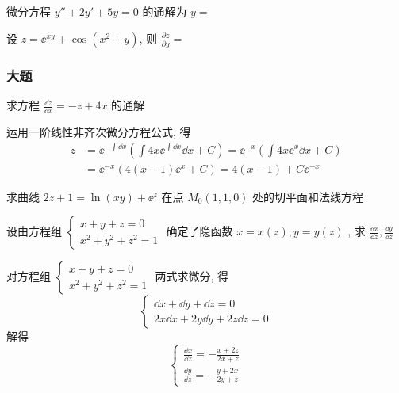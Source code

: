 \begin{ti}
	微分方程 $y''+2y'+5y=0$ 的通解为 $y=$ 
\end{ti}

\begin{ti}
	设 $z=\ee^{xy}+\cos\left(x^2+y\right)$, 则 $\frac{\partial z}{\partial y}=$ 
\end{ti}

\subsubsection{大题}
\begin{ti}
	求方程 $\frac{\dd{z}}{\dd{x}}=-z+4x$ 的通解
	\begin{solution}
		运用一阶线性非齐次微分方程公式, 得
		\begin{align*}
			z&=\ee^{-\int\dd{x}}\left( \int 4x\ee^{\int \dd{x}}\dd{x}+C\right) =\ee^{-x}\left( \int 4x\ee^{x}\dd{x}+C\right) \\
			&=\ee^{-x}\left( 4(x-1)\ee^{x}+C\right) =4(x-1)+C\ee^{-x}
		\end{align*}
	\end{solution}
\end{ti}

\begin{ti}
	求曲线 $2z+1=\ln(xy)+\ee^z$ 在点 $M_{0}(1,1,0)$ 处的切平面和法线方程
\end{ti}

\begin{ti}
	设由方程组 $\begin{cases}
		x+y+z=0\\
		x^2+y^2+z^2=1
		\end{cases}$
	确定了隐函数 $x=x(z),y=y(z)$ , 求 $\frac{\dd{x}}{\dd{z}},\frac{\dd{y}}{\dd{z}}$
	\begin{solution}
		对方程组 $\begin{cases}
		x+y+z=0\\
		x^2+y^2+z^2=1
		\end{cases}$ 两式求微分, 得
		\begin{equation*}
			\begin{cases}
			\dd{x}+\dd{y}+\dd{z}=0\\
			2x\dd{x}+2y\dd{y}+2z\dd{z}=0
			\end{cases}
		\end{equation*}
		解得
		\begin{equation*}
			\begin{cases}
			\frac{\dd{x}}{\dd{z}}=-\frac{x+2z}{2x+z}\\
			\frac{\dd{y}}{\dd{z}}=-\frac{y+2x}{2y+z}
			\end{cases}
		\end{equation*}
	\end{solution}
\end{ti}

